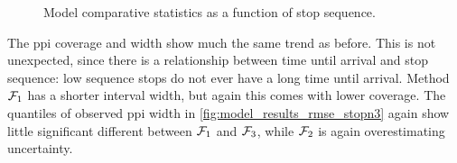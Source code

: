 \begin{knitrout}
\color{fgcolor}\begin{figure}
\newline
{}\newline
{}\caption[Model comparative statistics as a function of stop sequence]{Model comparative statistics as a function of stop sequence.}\label{fig:model_results_rmse_stopn}
\end{figure}


\end{knitrout}

The \gls{ppi} coverage and width show much the same trend as before. This is not unexpected, since there is a relationship between time until arrival and stop sequence: low sequence stops do not ever have a long time until arrival. Method $\mathcal{F}_1$ has a shorter interval width, but again this comes with lower coverage. The quantiles of observed \gls{ppi} width in \cref{fig:model_results_rmse_stopn3} again show little significant different between $\mathcal{F}_1$ and $\mathcal{F}_3$, while $\mathcal{F}_2$ is again overestimating uncertainty.



